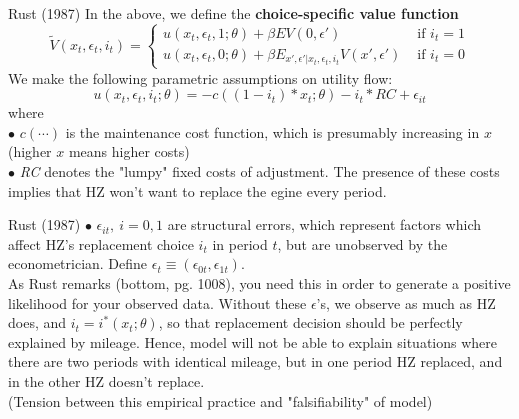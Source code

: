 \documentclass[xcolor=pdftex,dvipsnames,table,mathserif]{beamer}
\begin{document}
\begin{frame}{Rust (1987)}
In the above, we define the {\bf choice-specific value function}
\begin{equation*}
\tilde V (x_t, \epsilon_t, i_t) = \left \{ 
\begin{array}{lr}
u(x_t, \epsilon_t, 1;\theta) + \beta EV(0, \epsilon ') & \text{ if } i_t = 1 \\
u(x_t, \epsilon_t, 0; \theta) + \beta E_{x', \epsilon ' | x_t, \epsilon_t, i_t} V(x', \epsilon ') & \text{ if } i_t = 0
\end{array}
\right .
\end{equation*}
We make the following parametric assumptions on utility flow:
\begin{equation*}
u(x_t, \epsilon_t, i_t; \theta) = -c ((1-i_t) * x_t;\theta) - i_t * RC + \epsilon_{it}
\end{equation*}
where\\
\vspace{2mm}
$\bullet$ $c(\cdots)$ is the maintenance cost function, which is presumably increasing in $x$ (higher $x$ means higher costs) \\
\vspace{2mm}
$\bullet$ \emph{RC} denotes the "lumpy" fixed costs of adjustment. The presence of these costs implies that HZ won't want to replace the egine every period.
\end{frame}


\begin{frame}{Rust (1987)}
$\bullet$ $\epsilon_{it}, ~ i = 0,1$ are structural errors, which represent factors which affect HZ's replacement choice $i_t$ in period $t$, but are unobserved by the econometrician. Define $\epsilon_t \equiv (\epsilon_{0t}, \epsilon_{1t})$. \\
\vspace{3mm}
As Rust remarks (bottom, pg. 1008), you need this in order to generate a positive likelihood for your observed data. Without these $\epsilon$'s, we observe as much as HZ does, and $i_t = i^* (x_t; \theta)$, so that replacement decision should be perfectly explained by mileage. Hence, model will not be able to explain situations where there are two periods with identical mileage, but in one period HZ replaced, and in the other HZ doesn't replace. \\
\vspace{3mm}
(Tension between this empirical practice and "falsifiability" of model)
\end{frame}
\end{document}
